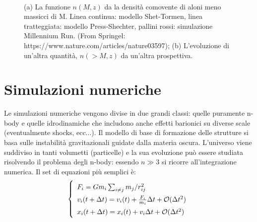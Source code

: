 \begin{figure}[H]
    \centering
    $\;\;$
    \caption{(a) La funzione $n(M,z)$ da la densità comovente di aloni meno massicci di M. Linea continua: modello Shet-Tormen, linea tratteggiata: modello Press-Shechter, pallini rossi: simulazione Millennium Run. (From Springel: https://www.nature.com/articles/nature03597); (b) L'evoluzione di un'altra quantità, $n(>M,z)$ da un'altra prospettiva.}
\end{figure}




\section{Simulazioni numeriche}
Le simulazioni numeriche vengono divise in due grandi classi: quelle puramente n-body e quelle idrodinamiche che includono anche effetti barionici su diverse scale (eventualmente shocks, ecc...). Il modello di base di formazione delle strutture si basa sulle instabilità gravitazionali guidate dalla materia oscura. L'universo viene suddiviso in tanti volumetti (particelle) e la sua evoluzione può essere studiata risolvendo il problema degli n-body: essendo $n\gg 3$ si ricorre all'integrazione numerica. 
Il set di equazioni più semplici è: 
\begin{equation}\left\{
    \def\arraystretch{1.5}
        \begin{array}{ll}
        F_i = Gm_i \sum_{i\neq j} m_j/r_{ij}^2 \\
        v_i(t+\Delta t)=v_i (t)+\frac{F_i}{m_i} \Delta t + \mathcal{O} (\Delta t^2) \\
        x_i(t+\Delta t)=x_i (t)+v_i \Delta t + \mathcal{O} (\Delta t^2)
    \end{array}\right. 
\end{equation}

